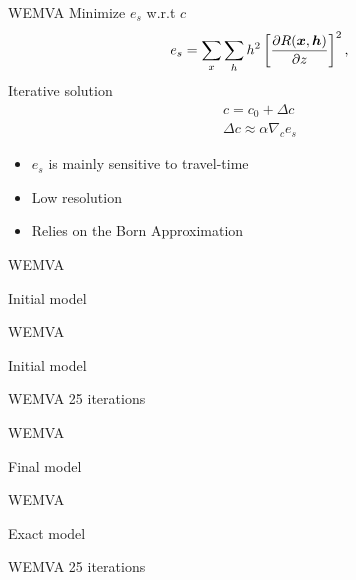 \documentclass[xcolor=dvipsnames]{beamer}
\begin{document}
\begin{frame}{WEMVA}
Minimize $e_s$ w.r.t $c$ 
\begin{eqnarray}
  e_s = \sum_x \sum_h h^2\left[\frac{\partial R(\mbox{\boldmath $x$},\mbox{\boldmath $h$})}{\partial z}\right]^2,
                   \label{eq:diffs}
\end{eqnarray}
%
Iterative solution
\begin{eqnarray}
  c=c_0+\Delta c \nonumber\\
  \Delta c \approx \alpha \nabla_c e_s
\end{eqnarray}
%
\begin{itemize}
\item $e_s$ is mainly sensitive to travel-time
\item Low resolution
\item Relies on the Born Approximation
\end{itemize}
\end{frame}
\begin{frame}{WEMVA}

Initial model 


%
\end{frame}
\begin{frame}{WEMVA}

{Initial model}\\


{WEMVA 25 iterations}\\


\end{frame}
%
\begin{frame}{WEMVA}

Final model 


%
\end{frame}
\begin{frame}{WEMVA}

{Exact model}\\


{WEMVA 25 iterations}\\



\end{frame}
\end{document}
